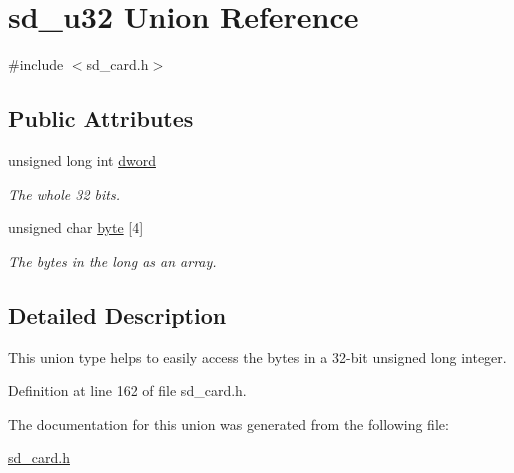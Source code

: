 \hypertarget{unionsd__u32}{\section{sd\-\_\-u32 Union Reference}
\label{unionsd__u32}
}


{\ttfamily \#include $<$sd\-\_\-card.\-h$>$}

\subsection*{Public Attributes}
\begin{DoxyCompactItemize}
\item 
\hypertarget{unionsd__u32_a9101523c7566bb78123dd6eb2c7e7042}{unsigned long int \hyperlink{unionsd__u32_a9101523c7566bb78123dd6eb2c7e7042}{dword}}\label{unionsd__u32_a9101523c7566bb78123dd6eb2c7e7042}

\begin{DoxyCompactList}\small\item\em The whole 32 bits. \end{DoxyCompactList}\item 
\hypertarget{unionsd__u32_a83a2ccef14787192d8443b5e85d0161b}{unsigned char \hyperlink{unionsd__u32_a83a2ccef14787192d8443b5e85d0161b}{byte} \mbox{[}4\mbox{]}}\label{unionsd__u32_a83a2ccef14787192d8443b5e85d0161b}

\begin{DoxyCompactList}\small\item\em The bytes in the long as an array. \end{DoxyCompactList}\end{DoxyCompactItemize}


\subsection{Detailed Description}
This union type helps to easily access the bytes in a 32-\/bit unsigned long integer. 

Definition at line 162 of file sd\-\_\-card.\-h.



The documentation for this union was generated from the following file\-:\begin{DoxyCompactItemize}
\item 
\hyperlink{sd__card_8h}{sd\-\_\-card.\-h}\end{DoxyCompactItemize}
